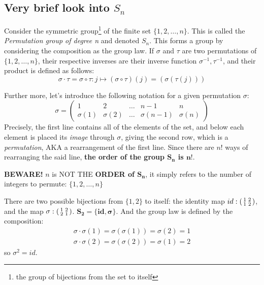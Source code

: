 \subsection{Very brief look into $S_n$}
Consider the symmetric group\footnote{the group of bijections from the set to itself} of the finite set $\{1, 2, \hdots, n\}$. This is called the \textit{Permutation group of degree n} and denoted $S_n$. This forms a group by considering the composition as the group law. If $\sigma$ and $\tau$ are two permutations of $\{1, 2, \hdots, n\}$, their respective inverses are their inverse function $\sigma^{-1}, \tau^{-1}$, and their product is defined as follows:
\begin{equation}\label{eq:formula-permutation-product}
    \sigma \cdot \tau = \sigma \circ \tau: j \longmapsto (\sigma \circ \tau)(j)=(\sigma(\tau(j))) 
\end{equation}

Further more, let's introduce the following notation for a given permutation $\sigma$:
$$ \sigma = \begin{pmatrix}
    1 & 2 & \hdots & n-1 & n \\
    \sigma(1) & \sigma(2) & \hdots & \sigma(n-1) & \sigma(n)
\end{pmatrix}$$ Precisely, the first line contains all of the elements of the set, and below each element is placed its \textit{image} through $\sigma$, giving the second row, which is a \textit{permutation}, AKA a rearrangement of the first line. Since there are $n!$ ways of rearranging the said line, \textbf{the order of the group $\bm{S_n}$ is $\bm{n!}$}. 

\textbf{BEWARE!} $n$ is NOT THE \textbf{ORDER of $\bm{S_n}$}, it simply refers to the number of integers to permute: $\{1, 2, \hdots, n\}$
\begin{example}
    \label{ex:permutation-S2}
    There are two possible bijections from $\{1, 2\}$ to itself: the identity map $id: \begin{psmallmatrix}
        1 & 2 \\
        1 & 2
    \end{psmallmatrix}$, and the map $\sigma: \begin{psmallmatrix}
        1 & 2 \\
        2 & 1
    \end{psmallmatrix}$. $\bm{S_2 = \{id, \sigma \}}$. And the group law is defined by the composition: 
    \begin{equation*}
        \begin{split}
        \sigma \cdot \sigma (1) = \sigma(\sigma(1)) = \sigma(2) = 1 \\
        \sigma \cdot \sigma (2) = \sigma(\sigma(2)) = \sigma(1) = 2
        \end{split}
    \end{equation*}
    so $\sigma^2 = id$.
\end{example}

